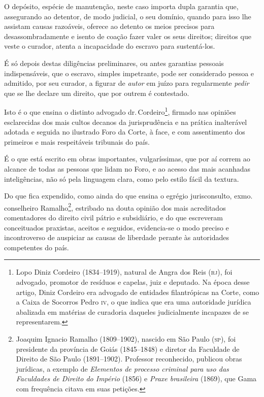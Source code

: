 O depósito, espécie de manutenção, neste caso importa dupla garantia
que, assegurando ao detentor, de modo judicial, o seu domínio, quando
para isso lhe assistam causas razoáveis, oferece ao detento os meios
precisos para desassombradamente e isento de coação fazer valer os seus
direitos; direitos que veste o curador, atenta a incapacidade do escravo
para sustentá-los.

É só depois destas diligências preliminares, ou antes garantias pessoais
indispensáveis, que o escravo, simples impetrante, pode ser considerado
pessoa e admitido, por seu curador, a figurar de \emph{autor} em juízo
para regularmente \emph{pedir} que se lhe declare um direito, que por
outrem é contestado.

Isto é o que ensina o distinto advogado dr.\,Cordeiro\footnote{Lopo
  Diniz Cordeiro (1834--1919), natural de Angra dos Reis (\textsc{rj}), foi
  advogado, promotor de resíduos e capelas, juiz e deputado. Na época
  desse artigo, Diniz Cordeiro era advogado de entidades filantrópicas
  na Corte, como a Caixa de Socorros Pedro \textsc{iv}, o que indica que era uma
  autoridade jurídica abalizada em matérias de curadoria daqueles
  judicialmente incapazes de se representarem.}, firmado nas opiniões
esclarecidas dos mais cultos decanos da jurisprudência e na prática
inalterável adotada e seguida no ilustrado Foro da Corte, à face, e com
assentimento dos primeiros e mais respeitáveis tribunais do país.

É o que está escrito em obras importantes, vulgaríssimas, que por aí
correm ao alcance de todas as pessoas que lidam no Foro, e ao acesso das
mais acanhadas inteligências, não só pela linguagem clara, como pelo
estilo fácil da textura.

Do que fica expendido, como ainda do que ensina o egrégio jurisconsulto,
exmo.\,conselheiro Ramalho\footnote{Joaquim Ignacio Ramalho
  (1809--1902), nascido em São Paulo (\textsc{sp}), foi presidente da província de
  Goiás (1845--1848) e diretor da Faculdade de Direito de São Paulo
  (1891--1902). Professor reconhecido, publicou obras jurídicas, a
  exemplo de \emph{Elementos de processo criminal para uso das
  Faculdades de Direito do Império} (1856) e \emph{Praxe brasileira}
  (1869), que Gama com frequência citava em suas petições.}, estribado
na douta opinião dos mais acreditados comentadores do direito civil
pátrio e subsidiário, e do que escreveram conceituados praxistas,
aceitos e seguidos, evidencia-se o modo preciso e incontroverso de
auspiciar as causas de liberdade perante às autoridades competentes do
país.

